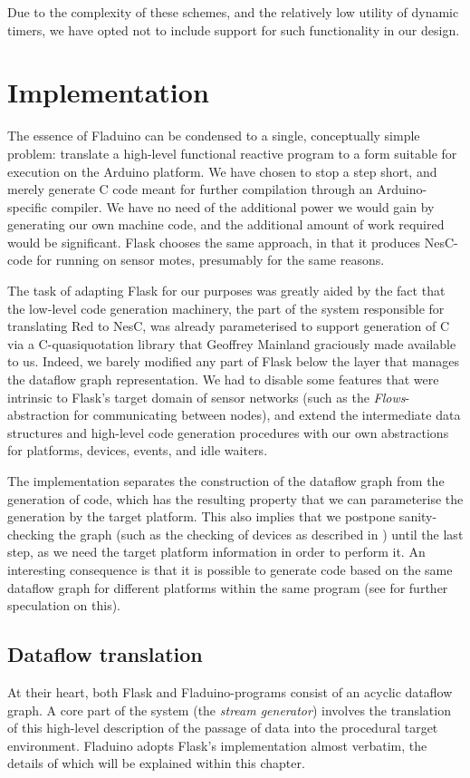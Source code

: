 \documentclass[a4paper, oneside, final]{memoir}
\let\Fref\undefined
\begin{document}
Due to the complexity of these schemes, and the relatively low utility
of dynamic timers, we have opted not to include support for such
functionality in our design.

\chapter{Implementation}
\label{chap:implementation}

The essence of Fladuino can be condensed to a single, conceptually
simple problem: translate a high-level functional reactive program to
a form suitable for execution on the Arduino platform.  We have chosen
to stop a step short, and merely generate C code meant for further
compilation through an Arduino-specific compiler.  We have no need of
the additional power we would gain by generating our own machine
code, and the additional amount of work required would be significant.
Flask chooses the same approach, in that it produces NesC-code for
running on sensor motes, presumably for the same reasons.

The task of adapting Flask for our purposes was greatly aided by the
fact that the low-level code generation machinery, the part of the
system responsible for translating Red to NesC, was already
parameterised to support generation of C via a C-quasiquotation library
that Geoffrey Mainland graciously made available to us.  Indeed, we
barely modified any part of Flask below the layer that manages the
dataflow graph representation.  We had to disable some features that
were intrinsic to Flask's target domain of sensor networks (such as
the \textit{Flows}-abstraction for communicating between nodes), and
extend the intermediate data structures and high-level code generation
procedures with our own abstractions for platforms, devices, events,
and idle waiters.

The implementation separates the construction of the dataflow graph
from the generation of code, which has the resulting property that we
can parameterise the generation by the target platform.  This also
implies that we postpone sanity-checking the graph (such as the
checking of devices as described in \Fref{sec:devices}) until the last
step, as we need the target platform information in order to perform
it.  An interesting consequence is that it is possible to generate
code based on the same dataflow graph for different platforms within
the same program (see \Fref{chap:futurework} for further speculation
on this).

\section{Dataflow translation}
\label{sec:dataflowtranslation}
At their heart, both Flask and Fladuino-programs consist of an
acyclic dataflow graph.  A core part of the system (the \textit{stream
  generator}) involves the translation of this high-level description
of the passage of data into the procedural target environment.
Fladuino adopts Flask's implementation almost verbatim, the details of
which will be explained within this chapter.
\end{document}
